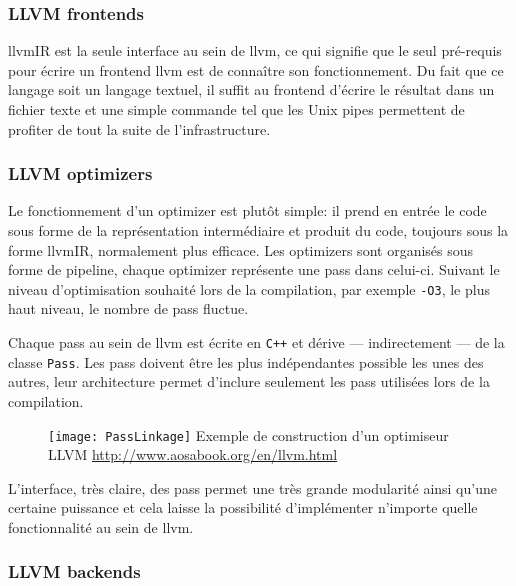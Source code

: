 \subsubsection{LLVM \og frontends \fg}

\gls{llvmIR} est la seule interface au sein de \gls{llvm}, ce qui signifie que le seul pré-requis pour écrire un \og frontend \fg \gls{llvm} est de connaître son fonctionnement. Du fait que ce langage soit un langage textuel, il suffit au \og frontend \fg d'écrire le résultat dans un fichier texte et une simple commande tel que les \og Unix pipes \fg permettent de profiter de tout la suite de l'infrastructure.

\subsubsection{LLVM \og optimizers \fg}

Le fonctionnement d'un \og optimizer \fg est plutôt simple: il prend en entrée le code sous forme de la représentation intermédiaire et produit du code, toujours sous la forme \gls{llvmIR}, normalement plus efficace. Les \og optimizers \fg sont organisés sous forme de pipeline, chaque \og optimizer \fg représente une \og pass \fg dans celui-ci. Suivant le niveau d'optimisation souhaité lors de la compilation, par exemple \texttt{-O3}, le plus haut niveau, le nombre de \og pass \fg fluctue.

Chaque \og pass \fg au sein de \gls{llvm} est écrite en \texttt{C++} et dérive --- indirectement --- de la classe \texttt{Pass}. Les \og pass \fg doivent être les plus indépendantes possible les unes des autres, leur architecture permet d'inclure seulement les \og pass \fg utilisées lors de la compilation.

\begin{figure}[H]
	\centering
	\texttt{[image: PassLinkage]}
	{Exemple de construction d'un optimiseur LLVM}
	{\url{http://www.aosabook.org/en/llvm.html}}
	\label{fig:PassLinkage}
\end{figure}

L'interface, très claire, des \og pass \fg permet une très grande modularité ainsi qu'une certaine puissance et cela laisse la possibilité d'implémenter n'importe quelle fonctionnalité au sein de \gls{llvm}.

\subsubsection{LLVM \og backends \fg}

